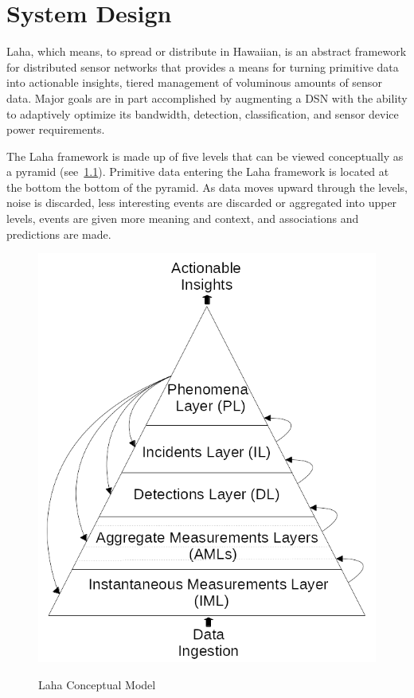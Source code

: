 
\chapter{System Design}\label{ch:system-design}
Laha, which means, to spread or distribute in Hawaiian, is an abstract framework for distributed sensor networks that provides a means for turning primitive data into actionable insights, tiered management of voluminous amounts of sensor data. Major goals are in part accomplished by augmenting a DSN with the ability to adaptively optimize its bandwidth, detection, classification, and sensor device power requirements.

The Laha framework is made up of five levels that can be viewed conceptually as a pyramid (see~\ref{laha-figure}). Primitive data entering the Laha framework is located at the bottom the bottom of the pyramid. As data moves upward through the levels, noise is discarded, less interesting events are discarded or aggregated into upper levels, events are given more meaning and context, and associations and predictions are made.

\begin{figure}
\caption{Laha Conceptual Model}
\centering
\includegraphics{figures/laha.png}
\label{laha-figure}
\end{figure}

